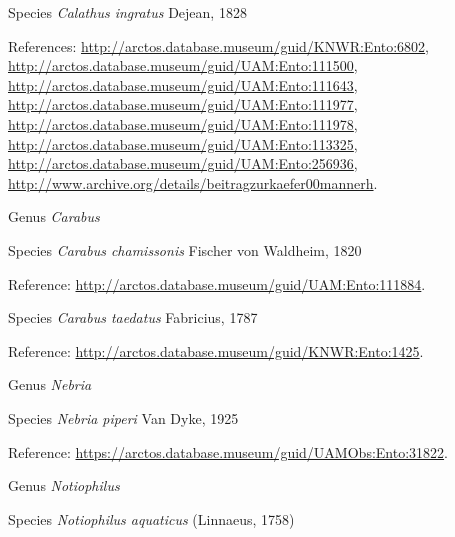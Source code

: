 \documentclass[9pt, article]{memoir}
\begin{document}
\begin{multicols}{2}
\vspace{6pt}\noindent\hspace{36pt}Species \textit{Calathus ingratus} Dejean, 1828


\vspace{6pt}References: 
\url{http://arctos.database.museum/guid/KNWR:Ento:6802}, 
\url{http://arctos.database.museum/guid/UAM:Ento:111500}, 
\url{http://arctos.database.museum/guid/UAM:Ento:111643}, 
\url{http://arctos.database.museum/guid/UAM:Ento:111977}, 
\url{http://arctos.database.museum/guid/UAM:Ento:111978}, 
\url{http://arctos.database.museum/guid/UAM:Ento:113325}, 
\url{http://arctos.database.museum/guid/UAM:Ento:256936}, 
\url{http://www.archive.org/details/beitragzurkaefer00mannerh}.

\vspace{6pt}\noindent\hspace{30pt}Genus \textit{Carabus}


\vspace{6pt}\noindent\hspace{36pt}Species \textit{Carabus chamissonis} Fischer von Waldheim, 1820


\vspace{6pt}Reference: 
\url{http://arctos.database.museum/guid/UAM:Ento:111884}.

\vspace{6pt}\noindent\hspace{36pt}Species \textit{Carabus taedatus} Fabricius, 1787


\vspace{6pt}Reference: 
\url{http://arctos.database.museum/guid/KNWR:Ento:1425}.

\vspace{6pt}\noindent\hspace{30pt}Genus \textit{Nebria}


\vspace{6pt}\noindent\hspace{36pt}Species \textit{Nebria piperi} Van Dyke, 1925


\vspace{6pt}Reference: 
\url{https://arctos.database.museum/guid/UAMObs:Ento:31822}.

\vspace{6pt}\noindent\hspace{30pt}Genus \textit{Notiophilus}


\vspace{6pt}\noindent\hspace{36pt}Species \textit{Notiophilus aquaticus} (Linnaeus, 1758)



\end{multicols}
\end{document}
